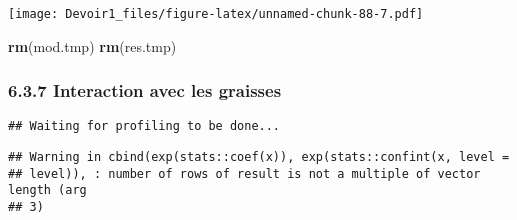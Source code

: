 \documentclass[]{article}
\newenvironment{Shaded}{\begin{snugshade}}{\end{snugshade}}
\newcommand{\KeywordTok}[1]{\textcolor[rgb]{0.13,0.29,0.53}{\textbf{#1}}}
\newcommand{\DataTypeTok}[1]{\textcolor[rgb]{0.13,0.29,0.53}{#1}}
\newcommand{\DecValTok}[1]{\textcolor[rgb]{0.00,0.00,0.81}{#1}}
\newcommand{\StringTok}[1]{\textcolor[rgb]{0.31,0.60,0.02}{#1}}
\newcommand{\OperatorTok}[1]{\textcolor[rgb]{0.81,0.36,0.00}{\textbf{#1}}}
\newcommand{\NormalTok}[1]{#1}
\begin{document}
\texttt{[image: Devoir1\_files/figure-latex/unnamed-chunk-88-7.pdf]}

\begin{Shaded}
\begin{Highlighting}[]
\KeywordTok{rm}\NormalTok{(mod.tmp)}
\KeywordTok{rm}\NormalTok{(res.tmp)}
\end{Highlighting}
\end{Shaded}

\subsubsection{6.3.7 Interaction avec les
graisses}\label{interaction-avec-les-graisses}

\begin{Shaded}
\end{Shaded}

\begin{verbatim}
## Waiting for profiling to be done...
\end{verbatim}

\begin{verbatim}
## Warning in cbind(exp(stats::coef(x)), exp(stats::confint(x, level =
## level)), : number of rows of result is not a multiple of vector length (arg
## 3)
\end{verbatim}
\end{document}
